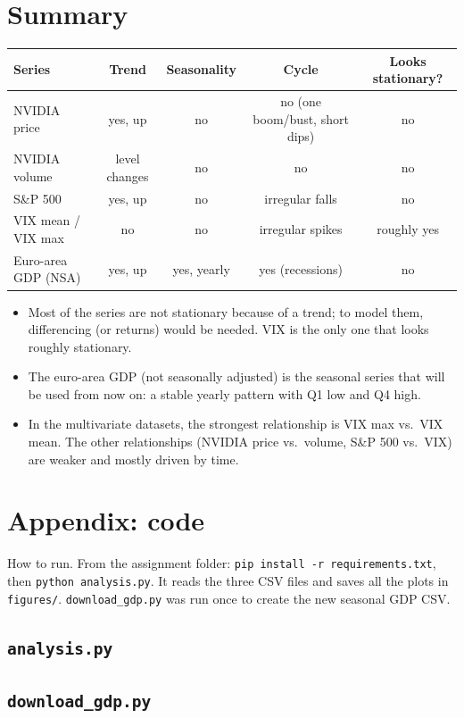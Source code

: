 \documentclass[11pt,a4paper]{article}
\begin{document}
\newpage
\section{Summary}

\begin{center}\small
\begin{tabular}{@{}lcccc@{}}
\toprule
Series & Trend & Seasonality & Cycle & Looks stationary? \\
\midrule
NVIDIA price             & yes, up        & no  & no (one boom/bust, short dips)  & no \\
NVIDIA volume            & level changes  & no  & no                  & no \\
S\&P 500                 & yes, up        & no  & irregular falls     & no \\
VIX mean / VIX max       & no             & no  & irregular spikes    & roughly yes \\
Euro-area GDP (NSA)      & yes, up        & yes, yearly & yes (recessions) & no \\
\bottomrule
\end{tabular}
\end{center}

\begin{itemize}
  \item Most of the series are not stationary because of a trend; to model them, differencing (or returns) would be needed. VIX is the only one that looks roughly stationary.
  \item The euro-area GDP (not seasonally adjusted) is the seasonal series that will be used from now on: a stable yearly pattern with Q1 low and Q4 high.
  \item In the multivariate datasets, the strongest relationship is VIX max vs.\ VIX mean. The other relationships (NVIDIA price vs.\ volume, S\&P 500 vs.\ VIX) are weaker and mostly driven by time.
\end{itemize}

\newpage
\appendix
\section*{Appendix: code}

How to run. From the assignment folder: \texttt{pip install -r requirements.txt}, then \texttt{python analysis.py}.
It reads the three CSV files and saves all the plots in \texttt{figures/}.
\texttt{download\_gdp.py} was run once to create the new seasonal GDP CSV.

\subsection*{\texttt{analysis.py}}


\subsection*{\texttt{download\_gdp.py}}

\end{document}
